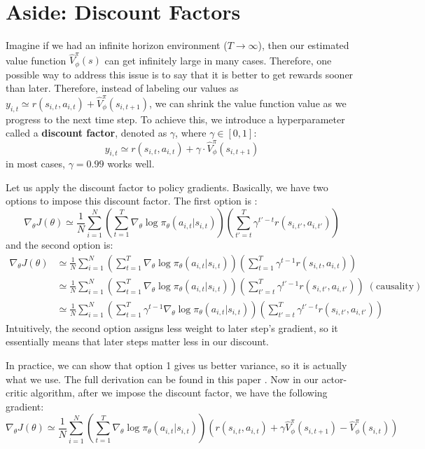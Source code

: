 \section{Aside: Discount Factors}
Imagine if we had an infinite horizon environment ($T\rightarrow\infty$), then our estimated value function $\hat{V}^\pi_\phi(s)$ can get infinitely large in many cases. Therefore, one possible way to address this issue is to say that it is better to get rewards sooner than later. Therefore, instead of labeling our values as $y_{i,t} \simeq r(s_{i,t}, a_{i,t}) + \hat{V}^\pi_\phi(s_{i,t+1})$, we can shrink the value function value as we progress to the next time step. To achieve this, we introduce a hyperparameter called a \textbf{discount factor}, denoted as $\gamma$, where $\gamma \in [0,1]$:
$$y_{i,t} \simeq r(s_{i,t}, a_{i,t}) + \gamma\cdot\hat{V}^\pi_\phi(s_{i,t+1})$$
in most cases, $\gamma = 0.99$ works well.

Let us apply the discount factor to policy gradients. Basically, we have two options to impose this discount factor. The first option is :
$$\nabla_\theta J(\theta) \simeq \frac{1}{N}\sum_{i=1}^N\left(\sum_{t=1}^T\nabla_\theta \log\pi_\theta(a_{i,t}|s_{i,t})\right)\left(\sum_{t'=t}^T \gamma^{t'-t}r(s_{i,t'},a_{i,t'})\right)$$
and the second option is:
$$\begin{aligned}
\nabla_\theta J(\theta) &\simeq \frac{1}{N}\sum_{i=1}^N\left(\sum_{t=1}^T\nabla_\theta \log\pi_\theta(a_{i,t}|s_{i,t})\right)\left(\sum_{t=1}^T \gamma^{t-1}r(s_{i,t},a_{i,t})\right)\\
&\simeq \frac{1}{N}\sum_{i=1}^N\left(\sum_{t=1}^T\nabla_\theta \log\pi_\theta(a_{i,t}|s_{i,t})\right)\left(\sum_{t'=t}^T \gamma^{t'-1}r(s_{i,t'},a_{i,t'})\right) \;\mathrm{(causality)}\\
&\simeq \frac{1}{N}\sum_{i=1}^N\left(\sum_{t=1}^T\gamma^{t-1}\nabla_\theta \log\pi_\theta(a_{i,t}|s_{i,t})\right)\left(\sum_{t'=t}^T \gamma^{t'-t}r(s_{i,t'},a_{i,t'})\right)
\end{aligned}$$
Intuitively, the second option assigns less weight to later step's gradient, so it essentially means that later steps matter less in our discount. 

In practice, we can show that option 1 gives us better variance, so it is actually what we use. The full derivation can be found in this paper \cite{thomas2014bias}. Now in our actor-critic algorithm, after we impose the discount factor, we have the following gradient:
$$\nabla_\theta J(\theta) \simeq \frac{1}{N}\sum_{i=1}^N\left(\sum_{t=1}^T\nabla_\theta \log\pi_\theta(a_{i,t}|s_{i,t})\right)\left(r(s_{i,t},a_{i,t}) + \gamma\hat{V}_\phi^\pi(s_{i,t+1})-\hat{V}_\phi^\pi(s_{i,t})\right)$$

